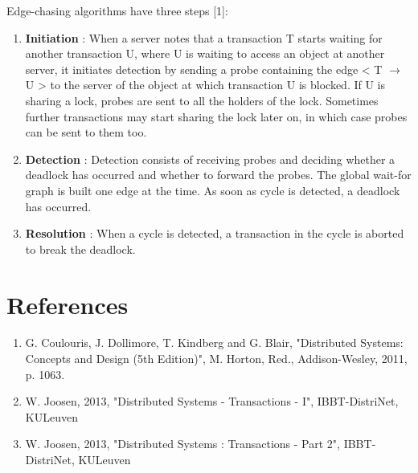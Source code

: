 Edge-chasing algorithms have three steps [1]:
\begin{enumerate}
	\item \textbf{Initiation} : When a server notes that a transaction T starts waiting for another transaction U, where U is waiting to access an object at another server, it initiates detection by sending a probe containing the edge < T $\rightarrow$ U > to the server of the object at which transaction U is blocked. If U is sharing a lock, probes are sent to all the holders of the lock. Sometimes further transactions may start sharing the lock later on, in which case probes can be sent to them too.
	\item \textbf{Detection} : Detection consists of receiving probes and deciding whether a deadlock has occurred and whether to forward the probes. The global wait-for graph is built one edge at the time. As soon as cycle is detected, a deadlock has occurred.
	\item \textbf{Resolution} : When a cycle is detected, a transaction in the cycle is aborted to break the deadlock.
\end{enumerate}


\section*{References}

\begin{enumerate}[1]
	\item G. Coulouris, J. Dollimore, T. Kindberg and G. Blair, "Distributed Systems: Concepts and Design (5th Edition)", M. Horton, Red., Addison-Wesley, 2011, p. 1063.
	\item W. Joosen, 2013, "Distributed Systems - Transactions - I", IBBT-DistriNet, KULeuven
	\item W. Joosen, 2013, "Distributed Systems : Transactions - Part 2", IBBT-DistriNet, KULeuven
\end{enumerate}